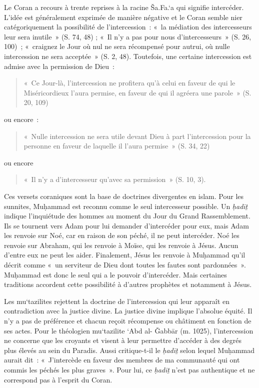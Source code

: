 Le Coran a recours à trente reprises à la racine Ša.Fa.`a qui signifie
intercéder. L'idée est généralement exprimée de manière négative et le
Coran semble nier catégoriquement la possibilité de l'intercession~:
«~la médiation des intercesseurs leur sera inutile~» (S. 74, 48) ; «~Il
n'y a pas pour nous d'intercesseurs~» (S. 26, 100)~; «~craignez le Jour
où nul ne sera récompensé pour autrui, où nulle intercession ne sera
acceptée~» (S. 2, 48). Toutefois, une certaine intercession est admise
avec la permission de Dieu~: 
\begin{quote}
    

«~Ce Jour-là, l'intercession ne profitera
qu'à celui en faveur de qui le Miséricordieux l'aura permise, en faveur
de qui il agréera une parole~» (S. 20, 109) 
\end{quote}
ou encore~:
\begin{quote}
    «~Nulle
intercession ne sera utile devant Dieu à part l'intercession pour la
personne en faveur de laquelle il l'aura permise~» (S. 34, 22)
\end{quote} ou encore
\begin{quote}
«~Il n'y a d'intercesseur qu'avec sa permission~» (S. 10, 3).
\end{quote}
Ces versets coraniques sont la base de doctrines divergentes en islam.
Pour les sunnites, Muḥammad est reconnu comme le seul intercesseur
possible. Un \emph{ḥadīṯ} indique l'inquiétude des hommes au moment du
Jour du Grand Rassemblement. Ils se tournent vers Adam pour lui demander
d'intercéder pour eux, mais Adam les renvoie sur Noé, car en raison de
son péché, il ne peut intercéder. Noé les renvoie sur Abraham, qui les
renvoie à Moïse, qui les renvoie à Jésus. Aucun d'entre eux ne peut les
aider. Finalement, Jésus les renvoie à Muḥammad qu'il décrit comme «~un
serviteur de Dieu dont toutes les fautes sont pardonnées~». Muḥammad est donc le seul qui
a le pouvoir d'intercéder. Mais certaines traditions accordent cette
possibilité à d'autres prophètes et notamment à Jésus.

Les mu`tazilites  rejettent la doctrine de l'intercession qui leur
apparaît en contradiction avec la justice divine. La justice divine
implique l'absolue équité. Il n'y a pas de préférence et chacun reçoit
récompense ou châtiment en fonction de ses actes. Pour le théologien
mu`tazilite `Abd al- Ǧabbār (m. 1025), l'intercession ne concerne que
les croyants et visent à leur permettre d'accéder à des degrés plus
élevés au sein du Paradis. Aussi critique-t-il le \emph{ḥadīṯ} selon
lequel Muḥammad aurait dit~: «~J'intercède en faveur des membres de ma
communauté qui ont commis les péchés les plus graves~». Pour lui, ce
\emph{ḥadīṯ} n'est pas authentique et ne correspond pas à l'esprit du
Coran.

